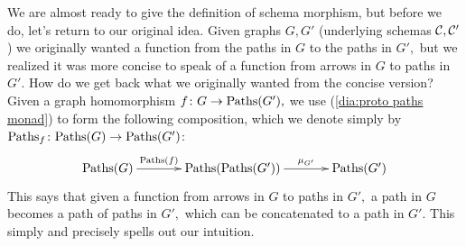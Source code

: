 \documentclass[CT4S-EN-RU]{subfiles}
\begin{document}
\begin{exerciseRUS}
\end{exerciseRUS}

\begin{blockENG}
We are almost ready to give the definition of schema morphism, but before we do, let's return to our original idea. Given graphs $G,G'$ (underlying schemas $\mathcal{C},\mathcal{C}'$) we originally wanted a function from the paths in $G$ to the paths in $G',$ but we realized it was more concise to speak of a function from arrows in $G$ to paths in $G'.$ How do we get back what we originally wanted from the concise version? Given a graph homomorphism $f\colon G\rightarrow\textnormal{Paths}(G'),$ we use (\ref{dia:proto paths monad}) to form the following composition, which we denote simply by $\textnormal{Paths}_f\colon\textnormal{Paths}(G)\rightarrow\textnormal{Paths}(G')$:
\begin{align}\label{dia:kleisli comp in graph}
\xymatrix@=35pt{\Paths(G)\ar[r]^-{\Paths(f)}&\Paths(\Paths(G'))\ar[r]^-{\mu_{G'}}&\Paths(G')}
\end{align}
This says that given a function from arrows in $G$ to paths in $G',$ a path in $G$ becomes a path of paths in $G',$ which can be concatenated to a path in $G'.$ This simply and precisely spells out our intuition.
\end{blockENG}

\begin{blockRUS}
\end{blockRUS}
\end{document}
